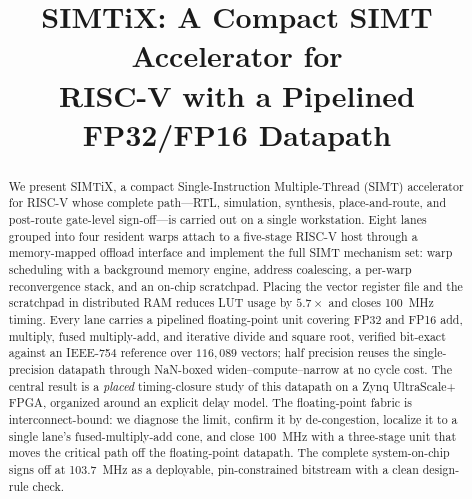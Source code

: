 \documentclass[10pt,conference]{IEEEtran}
\newif\ifanon
\begin{document}
\title{SIMTiX: A Compact SIMT Accelerator for\\
RISC-V with a Pipelined FP32/FP16 Datapath}

\ifanon
\author{\IEEEauthorblockN{Anonymous Author(s)}
\IEEEauthorblockA{Affiliation withheld for double-blind review}}
\else
\author{
\and
{}
}
\fi

\maketitle

\begin{abstract}
We present SIMTiX, a compact Single-Instruction Multiple-Thread (SIMT)
accelerator for RISC-V whose complete path---RTL, simulation, synthesis,
place-and-route, and post-route gate-level sign-off---is carried out on a single
workstation. Eight lanes grouped into four resident warps attach to a five-stage
RISC-V host through a memory-mapped offload interface and implement the full SIMT
mechanism set: warp scheduling with a background memory engine, address
coalescing, a per-warp reconvergence stack, and an on-chip scratchpad. Placing the
vector register file and the scratchpad in distributed RAM reduces LUT usage by
$5.7\times$ and closes 100~MHz timing. Every lane carries a pipelined
floating-point unit covering FP32 and FP16 add, multiply, fused multiply-add, and
iterative divide and square root, verified bit-exact against an IEEE-754 reference
over $116{,}089$ vectors; half precision reuses the single-precision datapath
through NaN-boxed widen--compute--narrow at no cycle cost. The central result is a
\emph{placed} timing-closure study of this datapath on a Zynq UltraScale+ FPGA,
organized around an explicit delay model. The floating-point fabric is
interconnect-bound: we diagnose the limit, confirm it by de-congestion, localize
it to a single lane's fused-multiply-add cone, and close 100~MHz with a
three-stage unit that moves the critical path off the floating-point datapath. The
complete system-on-chip signs off at 103.7~MHz as a deployable, pin-constrained
bitstream with a clean design-rule check.
\end{abstract}
\end{document}
